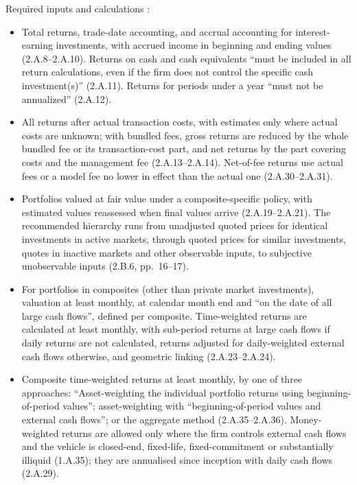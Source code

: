 \begin{qfmethod}\label{meth:gips-return-calculations}
 Required inputs and calculations \citep[sec.~2, pp.~8--15]{wide-gips-2020}:
\begin{itemize}
\item Total returns, trade-date accounting, and accrual accounting for interest-earning investments, with accrued income in beginning and ending values (2.A.8--2.A.10). Returns on cash and cash equivalents ``must be included in all return calculations, even if the firm does not control the specific cash investment(s)'' (2.A.11). Returns for periods under a year ``must not be annualized'' (2.A.12).
\item All returns after actual transaction costs, with estimates only where actual costs are unknown; with bundled fees, gross returns are reduced by the whole bundled fee or its transaction-cost part, and net returns by the part covering costs and the management fee (2.A.13--2.A.14). Net-of-fee returns use actual fees or a model fee no lower in effect than the actual one (2.A.30--2.A.31).
\item Portfolios valued at fair value under a composite-specific policy, with estimated values reassessed when final values arrive (2.A.19--2.A.21). The recommended hierarchy runs from unadjusted quoted prices for identical investments in active markets, through quoted prices for similar investments, quotes in inactive markets and other observable inputs, to subjective unobservable inputs (2.B.6, pp.~16--17).
\item For portfolios in composites (other than private market investments), valuation at least monthly, at calendar month end and ``on the date of all large cash flows'', defined per composite. Time-weighted returns are calculated at least monthly, with sub-period returns at large cash flows if daily returns are not calculated, returns adjusted for daily-weighted external cash flows otherwise, and geometric linking (2.A.23--2.A.24).
\item Composite time-weighted returns at least monthly, by one of three approaches: ``Asset-weighting the individual portfolio returns using beginning-of-period values''; asset-weighting with ``beginning-of-period values and external cash flows''; or the aggregate method (2.A.35--2.A.36). Money-weighted returns are allowed only where the firm controls external cash flows and the vehicle is closed-end, fixed-life, fixed-commitment or substantially illiquid (1.A.35); they are annualised since inception with daily cash flows (2.A.29).

\end{itemize}
\end{qfmethod}
